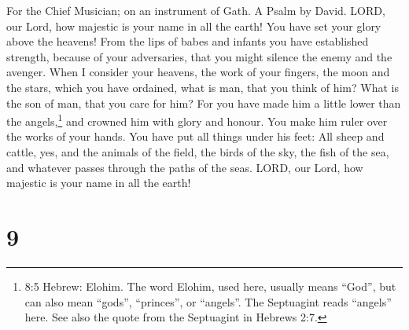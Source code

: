 For the Chief Musician; on an instrument of Gath. A Psalm by David.
 LORD, our Lord, how majestic is your name in all the earth!
You have set your glory above the heavens!  From the lips of
babes and infants you have established strength, because of your
adversaries, that you might silence the enemy and the avenger.
 When I consider your heavens, the work of your fingers, the
moon and the stars, which you have ordained,  what is man,
that you think of him? What is the son of man, that you care for him?
 For you have made him a little lower than the
angels,\footnote{8:5 Hebrew: Elohim. The word Elohim, used here, usually
  means ``God'', but can also mean ``gods'', ``princes'', or ``angels''.
  The Septuagint reads ``angels'' here. See also the quote from the
  Septuagint in Hebrews 2:7.} and crowned him with glory and honour.
 You make him ruler over the works of your hands. You have
put all things under his feet:  All sheep and cattle, yes,
and the animals of the field,  the birds of the sky, the
fish of the sea, and whatever passes through the paths of the seas.
 LORD, our Lord, how majestic is your name in all the earth!

\hypertarget{section-8}{%
\section{9}\label{section-8}}

